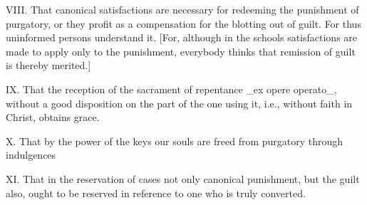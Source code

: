 VIII. That canonical satisfactions are necessary for redeeming the
punishment of purgatory, or they profit as a compensation for the
blotting out of guilt.  For thus uninformed persons understand it.
[For, although in the schools satisfactions are made to apply only to
the punishment, everybody thinks that remission of guilt is thereby
merited.]

IX. That the reception of the sacrament of repentance _ex opere
operato_, without a good disposition on the part of the one using it,
i.e., without faith in Christ, obtains grace.

X. That by the power of the keys our souls are freed from purgatory
through indulgences

XI. That in the reservation of cases not only canonical punishment,
but the guilt also, ought to be reserved in reference to one who is
truly converted.


